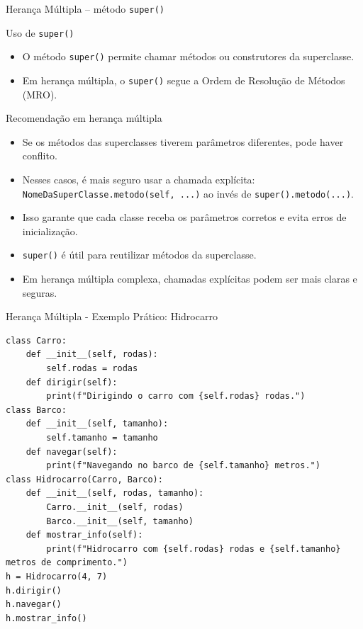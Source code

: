 \begin{frame}{Herança Múltipla – método \texttt{super()}}

\begin{block}{Uso de \texttt{super()}}
\begin{itemize}
    \item O método \texttt{super()} permite chamar métodos ou construtores da superclasse.
    \item Em herança múltipla, o \texttt{super()} segue a Ordem de Resolução de Métodos (MRO).
\end{itemize}
\end{block}

\begin{block}{Recomendação em herança múltipla}
\begin{itemize}
    \item Se os métodos das superclasses tiverem parâmetros diferentes, pode haver conflito.
    \item Nesses casos, é mais seguro usar a chamada explícita:  
    \texttt{NomeDaSuperClasse.metodo(self, ...)}  
    ao invés de \texttt{super().metodo(...)}.
    \item Isso garante que cada classe receba os parâmetros corretos e evita erros de inicialização.

    \item \texttt{super()} é útil para reutilizar métodos da superclasse.  
    \item Em herança múltipla complexa, chamadas explícitas podem ser mais claras e seguras.
    \end{itemize}
\end{block}

\end{frame}


\begin{frame}[fragile]{Herança Múltipla - Exemplo Prático: Hidrocarro}


\scriptsize
\begin{verbatim}
class Carro:
    def __init__(self, rodas):
        self.rodas = rodas
    def dirigir(self):
        print(f"Dirigindo o carro com {self.rodas} rodas.")
class Barco:
    def __init__(self, tamanho):
        self.tamanho = tamanho
    def navegar(self):
        print(f"Navegando no barco de {self.tamanho} metros.")
class Hidrocarro(Carro, Barco):
    def __init__(self, rodas, tamanho):
        Carro.__init__(self, rodas)
        Barco.__init__(self, tamanho)
    def mostrar_info(self):
        print(f"Hidrocarro com {self.rodas} rodas e {self.tamanho} metros de comprimento.")
h = Hidrocarro(4, 7)
h.dirigir()
h.navegar()
h.mostrar_info()
\end{verbatim}
\end{frame}